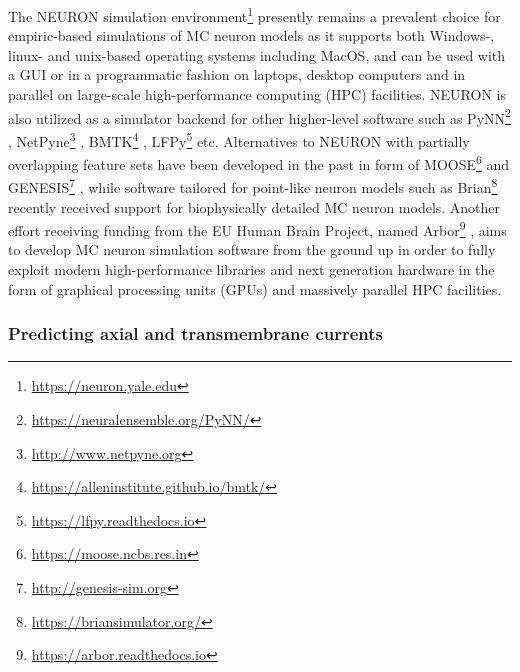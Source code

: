 The NEURON simulation environment\footnote{\href{https://neuron.yale.edu}{https://neuron.yale.edu}} \cite{Hines1997} presently remains a prevalent choice for empiric-based simulations of MC neuron models as it supports both Windows-, 
linux- and unix-based operating systems including MacOS, 
and can be used with a GUI or in a programmatic fashion on laptops, desktop computers and in parallel on large-scale high-performance computing (HPC) facilities. 
NEURON is also utilized as a simulator backend for other higher-level software such as 
PyNN\footnote{\href{https://neuralensemble.org/PyNN/}{https://neuralensemble.org/PyNN/}} \cite{Davison2008}, 
NetPyne\footnote{\href{http://www.netpyne.org}{http://www.netpyne.org}} \cite{Dura_Bernal_2019}, 
BMTK\footnote{\href{https://alleninstitute.github.io/bmtk/}{https://alleninstitute.github.io/bmtk/}} \cite{Dai2020}, 
LFPy\footnote{\href{https://lfpy.readthedocs.io}{https://lfpy.readthedocs.io}} \cite{Linden2014,Hagen2018} etc.
Alternatives to NEURON with partially overlapping feature sets have been developed in the past in form of 
MOOSE\footnote{\href{https://moose.ncbs.res.in}{https://moose.ncbs.res.in}} \cite{Bhalla2008} and 
GENESIS\footnote{\href{http://genesis-sim.org}{http://genesis-sim.org}} \cite{Bower1998}, 
while software tailored for point-like neuron models such as 
Brian\footnote{\href{https://briansimulator.org/}{https://briansimulator.org/}} \cite{Stimberg2019} recently received support for biophysically detailed MC neuron models.
Another effort receiving funding from the EU Human Brain Project, 
named Arbor\footnote{\href{https://arbor.readthedocs.io}{https://arbor.readthedocs.io}} \cite{Akar2019}, 
aims to develop MC neuron simulation software from the ground up in order to fully exploit modern high-performance libraries and next generation hardware in the form of graphical processing units (GPUs) and massively parallel HPC facilities. 


\subsubsection{Predicting axial and transmembrane currents}
\label{chap:LFPy_Ia_Im}

